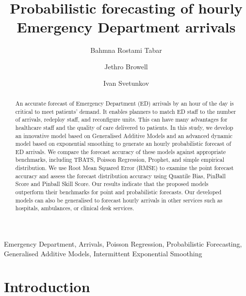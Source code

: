 \documentclass[]{elsarticle} %
\begin{document}
\begin{frontmatter}

  \title{Probabilistic forecasting of hourly Emergency Department arrivals}
    \author[Cardiff Business School]{Bahmna Rostami Tabar}
    \author[University of Glasgow]{Jethro Browell}
    \author[Lancaster University]{Ivan Svetunkov}
      \address[Cardiff Business School]{Cardiff Business School, Cardiff University, UK}
    \address[University of Glasgow]{School of Mathematics and Statistics, University of Glasgow, UK}
    \address[Lancaster University]{Centre for Marketing Analytics and Forecasting, Lancaster University, UK}
  
  \begin{abstract}
  An accurate forecast of Emergency Department (ED) arrivals by an hour of the day is critical to meet patients' demand. It enables planners to match ED staff to the number of arrivals, redeploy staff, and reconfigure units. This can have many advantages for healthcare staff and the quality of care delivered to patients. In this study, we develop an innovative model based on Generalised Additive Models and an advanced dynamic model based on exponential smoothing to generate an hourly probabilistic forecast of ED arrivals. We compare the forecast accuracy of these models against appropriate benchmarks, including TBATS, Poisson Regression, Prophet, and simple empirical distribution. We use Root Mean Squared Error (RMSE) to examine the point forecast accuracy and assess the forecast distribution accuracy using Quantile Bias, PinBall Score and Pinball Skill Score. Our results indicate that the proposed models outperform their benchmarks for point and probabilistic forecasts. Our developed models can also be generalised to forecast hourly arrivals in other services such as hospitals, ambulances, or clinical desk services.
  \end{abstract}
   \begin{keyword} Emergency Department, Arrivals, Poisson Regression, Probabilistic Forecasting, Generalised Additive Models, Intermittent Exponential Smoothing\end{keyword}
 \end{frontmatter}

\hypertarget{introduction}{%
\section{Introduction}\label{introduction}}
\end{document}
